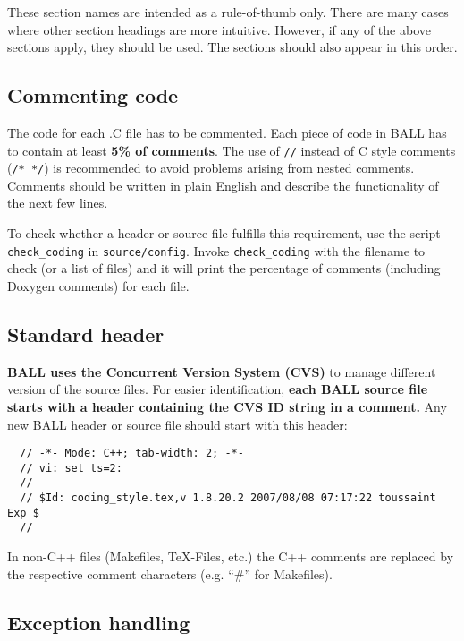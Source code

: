 \documentclass[a4paper,10pt]{article}
\begin{document}
These section names are intended as a rule-of-thumb only. There are many cases
where other section headings are more intuitive. However, if any of the above
sections apply, they should be used. The sections should also appear in this
order.

\subsection{Commenting code}

The code for each .C file has to be commented. Each piece of code in BALL has
to contain at least {\bf 5\% of comments}. The use of {\tt //} instead of C style
comments ({\tt /* */}) is recommended to avoid problems arising from nested
comments. Comments should be written in plain English and describe the
functionality of the next few lines.

To check whether a header or source file fulfills this requirement, use the
script {\tt check\_coding} in {\tt source/config}. Invoke {\tt check\_coding} with the
filename to check (or a list of files) and it will print the percentage of
comments (including Doxygen comments) for each file.

\subsection{Standard header}
                                                                                                                                                             
{\bf BALL uses the Concurrent Version System (CVS)} to manage different
version of the
source files. For easier identification, {\bf each BALL source file starts
with a header containing the CVS ID string in a comment.} Any new BALL header
or source file should start with this header:
\begin{verbatim}
  // -*- Mode: C++; tab-width: 2; -*-
  // vi: set ts=2:
  //
  // $Id: coding_style.tex,v 1.8.20.2 2007/08/08 07:17:22 toussaint Exp $
  //                                                                                                                                                             
\end{verbatim}
In non-C++ files (Makefiles, TeX-Files, etc.) the C++ comments are replaced
by the respective comment characters (e.g. ``\#'' for Makefiles).

\subsection{Exception handling}
\end{document}
